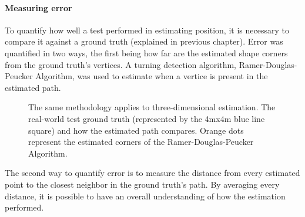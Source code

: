 \paragraph{Measuring error}


To quantify how well a test performed in estimating position, it is necessary to compare it against a ground truth (explained in previous chapter). Error was quantified in two ways, the first being how far are the estimated shape corners from the ground truth's vertices. A turning detection algorithm, Ramer-Douglas-Peucker Algorithm, was used to estimate when a vertice is present in the estimated path.


\begin{figure}[!h]
    \centering
    \resizebox{0.8\linewidth}{!}{}
    \caption{The same methodology applies to three-dimensional estimation. The real-world test ground truth (represented by the 4mx4m  blue line square) and how the estimated path compares. Orange dots represent the estimated corners of the Ramer-Douglas-Peucker Algorithm.}
    \label{fig:square3D_truth}
\end{figure}

The second way to quantify error is to measure the distance from every estimated point to the closest neighbor in the ground truth's path. By averaging every distance, it is possible to have an overall understanding of how the estimation performed.

\begin{figure}[!h]
    \centering
    \begin{subfigure}{0.75\textwidth}
        \centering
        \resizebox{1\linewidth}{!}{}
        \label{fig:square3D_error}
    \end{subfigure}


    \begin{subfigure}{0.75\textwidth}
        \centering
        \resizebox{1\linewidth}{!}{}
        \label{fig:square3D_point}
    \end{subfigure}
    \label{fig:error_methods_3D}
\end{figure}


